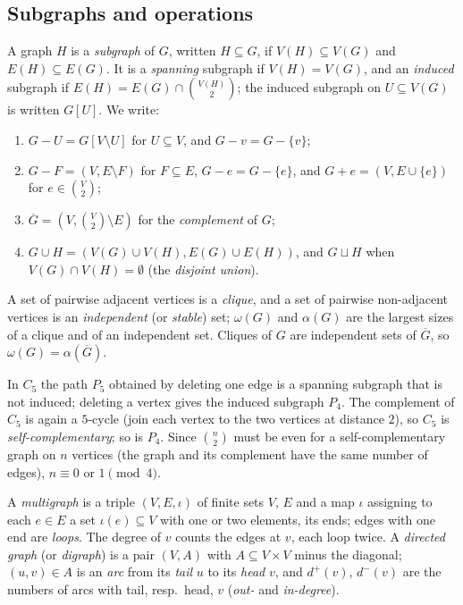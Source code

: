 \subsection{Subgraphs and operations}\label{graph-theory:subsection-subgraphs}

\begin{definition}\label{graph-theory:definition-subgraph}
A graph $H$ is a \emph{subgraph} of $G$, written $H \subseteq G$, if $V(H) \subseteq V(G)$ and $E(H) \subseteq E(G)$. It is a \emph{spanning} subgraph if $V(H) = V(G)$, and an
\emph{induced} subgraph if $E(H) = E(G) \cap \binom{V(H)}{2}$; the induced subgraph on $U \subseteq V(G)$ is written $G[U]$. We write:
\begin{enumerate}
\item $G - U = G[V \setminus U]$ for $U \subseteq V$, and $G - v = G - \{v\}$;
\item $G - F = (V, E \setminus F)$ for $F \subseteq E$, $G - e = G - \{e\}$, and $G + e = (V, E \cup \{e\})$ for $e \in \binom{V}{2}$;
\item $\overline{G} = (V, \binom{V}{2} \setminus E)$ for the \emph{complement} of $G$;
\item $G \cup H = (V(G) \cup V(H), E(G) \cup E(H))$, and $G \sqcup H$ when $V(G) \cap V(H) = \emptyset$ (the \emph{disjoint union}).
\end{enumerate}
A set of pairwise adjacent vertices is a \emph{clique}, and a set of pairwise non-adjacent vertices is an \emph{independent} (or \emph{stable}) set; $\omega(G)$ and $\alpha(G)$ are the
largest sizes of a clique and of an independent set. Cliques of $G$ are independent sets of $\overline{G}$, so $\omega(G) = \alpha(\overline{G})$.
\end{definition}

\begin{example}\label{graph-theory:example-subgraphs}
In $C_5$ the path $P_5$ obtained by deleting one edge is a spanning subgraph that is not induced; deleting a vertex gives the induced subgraph $P_4$. The complement of $C_5$ is again a
$5$-cycle (join each vertex to the two vertices at distance $2$), so $C_5$ is \emph{self-complementary}; so is $P_4$. Since $\binom{n}{2}$ must be even for a self-complementary graph on
$n$ vertices (the graph and its complement have the same number of edges), $n \equiv 0$ or $1 \pmod 4$.
\end{example}

\begin{definition}\label{graph-theory:definition-multigraph}
A \emph{multigraph} is a triple $(V, E, \iota)$ of finite sets $V$, $E$ and a map $\iota$ assigning to each $e \in E$ a set $\iota(e) \subseteq V$ with one or two elements, its ends; edges with one
end are \emph{loops}. The degree of $v$ counts the edges at $v$, each loop twice. A \emph{directed graph} (or \emph{digraph}) is a pair $(V, A)$ with $A \subseteq V \times V$ minus the diagonal;
$(u, v) \in A$ is an \emph{arc} from its \emph{tail} $u$ to its \emph{head} $v$, and $d^+(v)$, $d^-(v)$ are the numbers of arcs with tail, resp.\ head, $v$ (\emph{out-} and \emph{in-degree}).
\end{definition}

